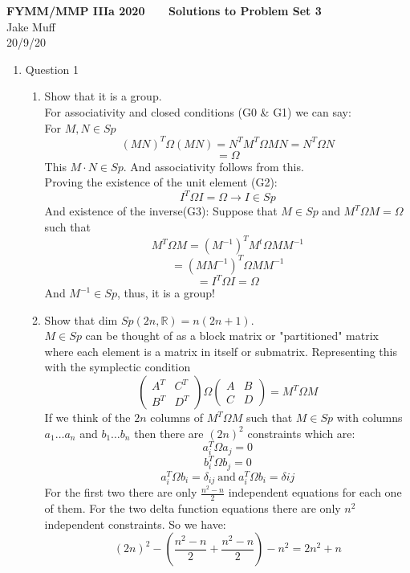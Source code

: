 \documentclass[12pt]{article}
\begin{document}
\normalsize

\baselineskip 14pt

\begin{center}
{\Large {\bf FYMM/MMP IIIa 2020 \ \ \  Solutions to Problem Set 3}}
\\
Jake Muff \\
20/9/20
\end{center}

\bigskip





\begin{enumerate}
\item Question 1 
\begin{enumerate}
\item Show that it is a group.
\\
For associativity and closed conditions (G0 \& G1) we can say:
\\
For $M,N \in Sp $
$$ (MN)^T \Omega (MN) = N^T M^T \Omega MN = N^T \Omega N $$
$$ = \Omega $$
This $M \cdot N \in Sp $. And associativity follows from this. \\
Proving the existence of the unit element (G2):
$$ I^T \Omega I = \Omega \rightarrow I \in Sp $$ 
And existence of the inverse(G3): Suppose that $M \in Sp $ and $M^T \Omega M = \Omega $ such that
$$ M^T \Omega M = (M^{-1})^T M^t \Omega M M^{-1} $$ 
$$ = (MM^{-1})^T \Omega MM^{-1} $$
$$ = I^T \Omega I = \Omega $$
And $M^{-1} \in Sp $, thus, it is a group!
\item Show that dim $Sp(2n,\mathbb{R})=n(2n+1)$.
\\
$M \in Sp$ can be thought of as a block matrix or "partitioned" matrix where each element is a matrix in itself or submatrix. Representing this with the symplectic condition 
$$ \left( \begin{array}{cc} A^T & C^T \\ B^T & D^T \end{array} \right) \Omega  \left( \begin{array}{cc} A & B \\ C & D \end{array} \right) = M^T \Omega M $$
If we think of the $2n$ columns of $M^T \Omega M $ such that $M \in Sp$ with columns $a_1 \ldots a_n$ and $b_1 \ldots b_n$ then there are $(2n)^2$ constraints which are:
$$ a_i^T \Omega a_j =0 $$
$$ b_i^T \Omega b_j = 0 $$ 
$$ a_i^T \Omega b_i = \delta_{ij} \ \text{and} \  a_i^T \Omega b_i = \delta{ij} $$
For the first two there are only $\frac{n^2 -n} {2} $ independent equations for each one of them. For the two delta function equations there are only $n^2$ independent constraints. So we have:
$$ (2n)^2 - (\frac{n^2-n}{2} + \frac{n^2 -n}{2} ) - n^2 = 2n^2 +n $$


\end{enumerate}
\end{enumerate}
\end{document}

